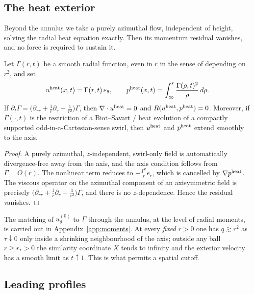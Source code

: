 \subsection{The heat exterior}
\label{sec:heat}

Beyond the annulus we take a purely azimuthal flow, independent of height, solving the radial heat equation exactly. Then its momentum residual vanishes, and no force is required to sustain it.

\begin{proposition}
\label{prop:heat}
Let $\Gamma(r,t)$ be a smooth radial function, even in $r$ in the sense of depending on $r^2$, and set
\[
u^{\mathrm{heat}}(x,t)=\Gamma(r,t)\,e_\theta,
\qquad
p^{\mathrm{heat}}(x,t)=\int_{\infty}^{r}\frac{\Gamma(\rho,t)^2}{\rho}\,d\rho.
\]
If $\partial_t\Gamma=\bigl(\partial_{rr}+\tfrac1r\partial_r-\tfrac1{r^2}\bigr)\Gamma$, then $\nabla\cdot u^{\mathrm{heat}}=0$ and $R(u^{\mathrm{heat}},p^{\mathrm{heat}})=0$. Moreover, if $\Gamma(\cdot,t)$ is the restriction of a {B}iot--{S}avart / heat evolution of a compactly supported odd-in-a-Cartesian-sense swirl, then $u^{\mathrm{heat}}$ and $p^{\mathrm{heat}}$ extend smoothly to the axis.
\end{proposition}

\begin{proof}
A purely azimuthal, $z$-independent, swirl-only field is automatically divergence-free away from the axis, and the axis condition follows from $\Gamma=O(r)$. The nonlinear term reduces to $-\frac{\Gamma^2}{r}e_r$, which is cancelled by $\nabla p^{\mathrm{heat}}$. The viscous operator on the azimuthal component of an axisymmetric field is precisely $\bigl(\partial_{rr}+\tfrac1r\partial_r-\tfrac1{r^2}\bigr)\Gamma$, and there is no $z$-dependence. Hence the residual vanishes.
\end{proof}

The matching of $u^{(0)}_\theta$ to $\Gamma$ through the annulus, at the level of radial moments, is carried out in Appendix~\ref{app:moments}. At every \emph{fixed} $r>0$ one has $q\gtrsim r^{2}$ as $\tau\downarrow 0$ only inside a shrinking neighbourhood of the axis; outside any ball $r\ge r_*>0$ the similarity coordinate $X$ tends to infinity and the exterior velocity has a smooth limit as $t\uparrow 1$. This is what permits a spatial cutoff.

\subsection{Leading profiles}
\label{sec:profiles}

